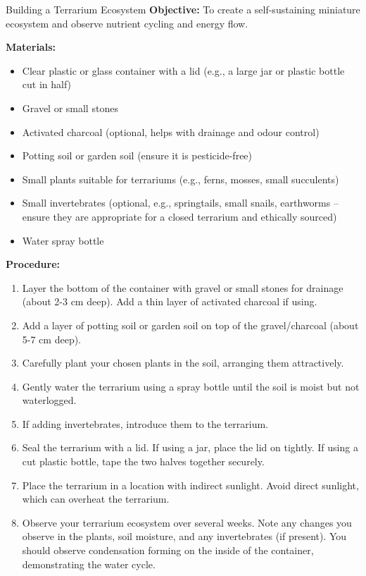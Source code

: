 \begin{investigation}{Building a Terrarium Ecosystem}
\textbf{Objective:} To create a self-sustaining miniature ecosystem and observe nutrient cycling and energy flow.

\textbf{Materials:}
\begin{itemize}
    \item Clear plastic or glass container with a lid (e.g., a large jar or plastic bottle cut in half)
    \item Gravel or small stones
    \item Activated charcoal (optional, helps with drainage and odour control)
    \item Potting soil or garden soil (ensure it is pesticide-free)
    \item Small plants suitable for terrariums (e.g., ferns, mosses, small succulents)
    \item Small invertebrates (optional, e.g., springtails, small snails, earthworms – ensure they are appropriate for a closed terrarium and ethically sourced)
    \item Water spray bottle
\end{itemize}

\textbf{Procedure:}
\begin{enumerate}
    \item Layer the bottom of the container with gravel or small stones for drainage (about 2-3 cm deep). Add a thin layer of activated charcoal if using.
    \item Add a layer of potting soil or garden soil on top of the gravel/charcoal (about 5-7 cm deep).
    \item Carefully plant your chosen plants in the soil, arranging them attractively.
    \item Gently water the terrarium using a spray bottle until the soil is moist but not waterlogged.
    \item If adding invertebrates, introduce them to the terrarium.
    \item Seal the terrarium with a lid. If using a jar, place the lid on tightly. If using a cut plastic bottle, tape the two halves together securely.
    \item Place the terrarium in a location with indirect sunlight. Avoid direct sunlight, which can overheat the terrarium.
    \item Observe your terrarium ecosystem over several weeks. Note any changes you observe in the plants, soil moisture, and any invertebrates (if present). You should observe condensation forming on the inside of the container, demonstrating the water cycle.
\end{enumerate}


\end{investigation}
